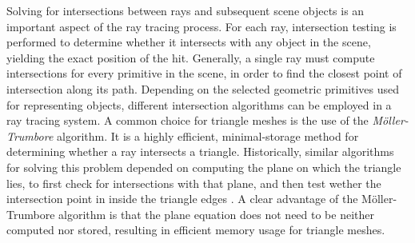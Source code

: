 Solving for intersections between rays and subsequent scene objects is an important aspect of the ray tracing process.
For each ray, intersection testing is performed to determine whether it intersects with any object in the scene, yielding the exact position of the hit.
Generally, a single ray must compute intersections for every primitive in the scene, in order to find the closest point of intersection along its path.
Depending on the selected geometric primitives used for representing objects, different intersection algorithms can be employed in a ray tracing system.
A common choice for triangle meshes is the use of the \textit{M{\"o}ller-Trumbore} \supercite{Moller2005} algorithm.
It is a highly efficient, minimal-storage method for determining whether a ray intersects a triangle.
Historically, similar algorithms for solving this problem depended on computing the plane on which the triangle lies, to first check for intersections with that plane, and then test wether the intersection point in inside the triangle edges \supercite{Bogart1988}. 
A clear advantage of the M{\"o}ller-Trumbore algorithm is that the plane equation does not need to be neither computed nor stored, resulting in efficient memory usage for triangle meshes.

